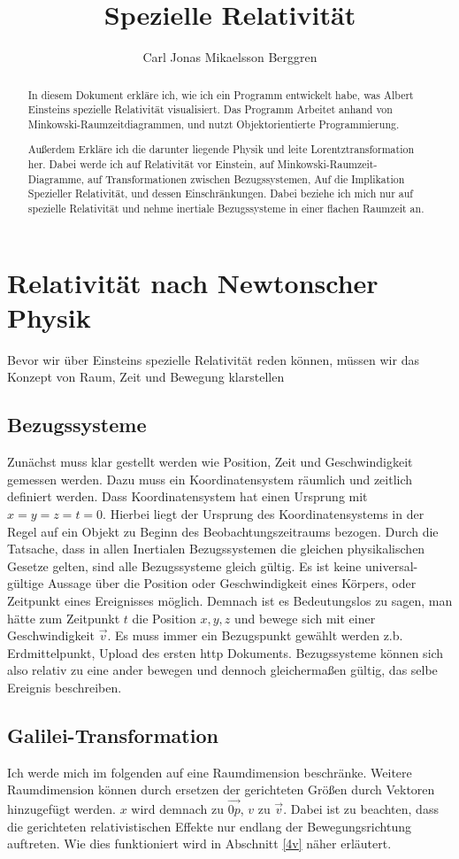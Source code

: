 \documentclass[12pt]{article}
\author{{\Huge Carl Jonas Mikaelsson Berggren}}
\title{{\myfont Spezielle Relativität}}
\begin{document}
\maketitle
\tableofcontents
\newpage
\begin{abstract}
In diesem Dokument erkläre ich, wie ich ein Programm entwickelt habe, was Albert Einsteins spezielle Relativität visualisiert.
Das Programm Arbeitet anhand von Minkowski-Raumzeitdiagrammen, und nutzt Objektorientierte Programmierung.

Außerdem Erkläre ich die darunter liegende Physik und leite Lorentztransformation her.
Dabei werde ich auf Relativität vor Einstein, auf Minkowski-Raumzeit-Diagramme, auf Transformationen zwischen Bezugssystemen, Auf die Implikation Spezieller Relativität, und dessen Einschränkungen.
Dabei beziehe ich mich nur auf spezielle Relativität und nehme inertiale Bezugssysteme in einer flachen Raumzeit an.
\end{abstract}
\section{Relativität nach Newtonscher Physik}
Bevor wir über Einsteins spezielle Relativität reden können, müssen wir das Konzept von Raum, Zeit und Bewegung klarstellen
\subsection{Bezugssysteme}
Zunächst muss klar gestellt werden wie Position, Zeit und Geschwindigkeit gemessen werden.
Dazu muss ein Koordinatensystem räumlich und zeitlich definiert werden.
Dass Koordinatensystem hat einen Ursprung  mit $x = y = z = t = 0$.
Hierbei liegt der Ursprung des Koordinatensystems in der Regel auf ein Objekt zu Beginn des Beobachtungszeitraums bezogen.
Durch die Tatsache, dass in allen Inertialen Bezugssystemen die gleichen physikalischen Gesetze gelten, sind alle Bezugssysteme gleich gültig.
Es ist keine universal-gültige Aussage über die Position oder Geschwindigkeit eines Körpers, oder Zeitpunkt eines Ereignisses möglich.
Demnach ist es Bedeutungslos zu sagen, man hätte zum Zeitpunkt $t$ die Position $x, y, z$ und bewege sich mit einer Geschwindigkeit $\vec{v}$.
Es muss immer ein Bezugspunkt gewählt werden z.b. Erdmittelpunkt, Upload des ersten http Dokuments.
Bezugssysteme können sich also relativ zu eine ander bewegen und dennoch gleichermaßen gültig, das selbe Ereignis beschreiben.
\subsection{Galilei-Transformation}
Ich werde mich im folgenden auf eine Raumdimension beschränke.
Weitere Raumdimension können durch ersetzen der gerichteten Größen durch Vektoren hinzugefügt werden.
$x$ wird demnach zu $\vec{0p}$, $v$ zu $\vec{v}$.
Dabei ist zu beachten, dass die gerichteten relativistischen Effekte nur endlang der Bewegungsrichtung auftreten.
Wie dies funktioniert wird in Abschnitt \ref{4v} näher erläutert.
\end{document}
